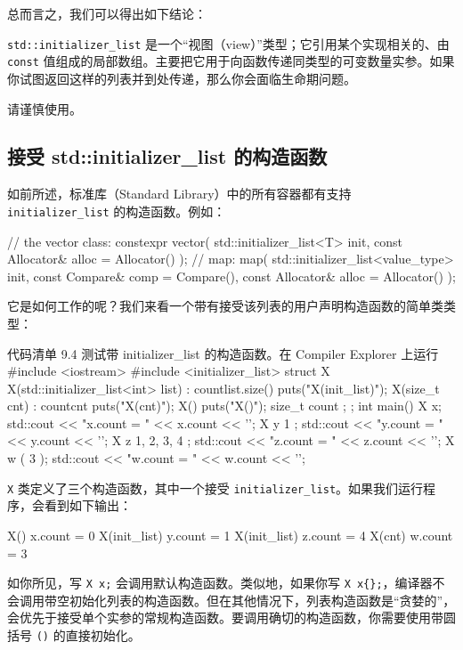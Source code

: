 总而言之，我们可以得出如下结论：

\begin{myWarnBox}
\texttt{std::initializer\_list} 是一个“视图（view）”类型；它引用某个实现相关的、由 \texttt{const} 值组成的局部数组。主要把它用于向函数传递同类型的可变数量实参。如果你试图返回这样的列表并到处传递，那么你会面临生命期问题。
\end{myWarnBox}

请谨慎使用。

\subsection{接受 std::initializer\_list 的构造函数}

如前所述，标准库（Standard Library）中的所有容器都有支持 \texttt{initializer\_list} 的构造函数。例如：

\begin{codebox}[cpp]
// the vector class:
constexpr vector( std::initializer_list<T> init,
                  const Allocator& alloc = Allocator() );
// map:
map( std::initializer_list<value_type> init,
     const Compare& comp = Compare(),
     const Allocator& alloc = Allocator() );
\end{codebox}

它是如何工作的呢？我们来看一个带有接受该列表的用户声明构造函数的简单类类型：

\begin{codeboxt}[cpp]{代码清单 9.4 测试带 initializer\_list 的构造函数。在 Compiler Explorer 上运行}
#include <iostream>
#include <initializer_list>
struct X {
    X(std::initializer_list<int> list)
    : count{list.size()} { puts("X(init_list)"); }
    X(size_t cnt) : count{cnt} { puts("X(cnt)"); }
    X() { puts("X()"); }
    size_t count {};
};
int main() {
    X x;
    std::cout << "x.count = " << x.count << '\n';
    X y { 1 };
    std::cout << "y.count = " << y.count << '\n';
    X z { 1, 2, 3, 4 };
    std::cout << "z.count = " << z.count << '\n';
    X w ( 3 );
    std::cout << "w.count = " << w.count << '\n';
}
\end{codeboxt}


\texttt{X} 类定义了三个构造函数，其中一个接受 \texttt{initializer\_list}。如果我们运行程序，会看到如下输出：

\begin{codebox}[cpp]
X()
x.count = 0
X(init_list)
y.count = 1
X(init_list)
z.count = 4
X(cnt)
w.count = 3
\end{codebox}

如你所见，写 \texttt{X x;} 会调用默认构造函数。类似地，如果你写 \texttt{X x\{\};}，编译器不会调用带空初始化列表的构造函数。但在其他情况下，列表构造函数是“贪婪的”，会优先于接受单个实参的常规构造函数。要调用确切的构造函数，你需要使用带圆括号 \texttt{()} 的直接初始化。

